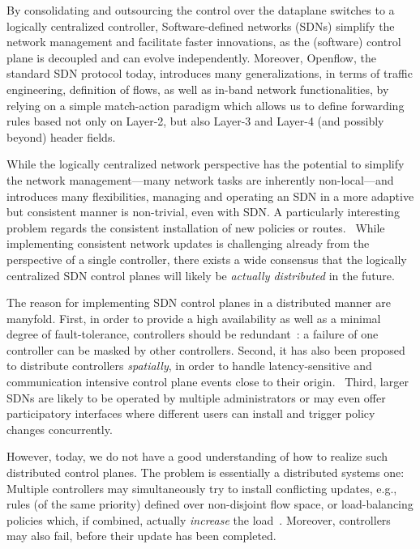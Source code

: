 \documentclass[conference]{sigcomm-alternate}
\begin{document}
By consolidating and outsourcing the control over the dataplane switches to a logically
centralized controller,
Software-defined networks (SDNs) simplify the network management and facilitate faster
innovations, as the (software) control plane is decoupled and can evolve independently.
Moreover, Openflow, the standard SDN protocol today, introduces many generalizations,
in terms of traffic engineering, definition of flows, as well as in-band network functionalities,
by relying on a simple match-action paradigm which allows us to define
forwarding rules based not only on Layer-2, but also Layer-3 and Layer-4 (and possibly beyond)
header fields.

While the logically centralized network perspective has the potential to simplify
the network management---many network tasks are inherently non-local---and introduces
many flexibilities,
managing and operating an SDN in a more adaptive but consistent manner is non-trivial, even with SDN.
A particularly interesting problem regards the consistent installation of new policies
or routes.~\cite{network-update,roger-hotnets,correct} While implementing consistent network updates
is challenging already from the perspective of a single controller, there exists a wide consensus
that the logically centralized SDN control planes will likely be \emph{actually distributed} in the future.

The reason for implementing SDN control planes in a distributed manner are manyfold.
First, in order to provide a high availability as well as a minimal degree of
fault-tolerance, controllers should be redundant~\cite{onix,stn,onos}: a failure
of one controller can be masked by other controllers. Second, it has also been proposed
to distribute controllers \emph{spatially}, in order to handle latency-sensitive and
communication intensive control plane events close to their origin.~\cite{devoflow,kandoo,jukka,disco}
Third, larger SDNs are likely to be operated by multiple administrators or may even offer
participatory interfaces where different users can install and trigger policy changes
concurrently.~\cite{participatory,stn}

However, today, we do not have a good understanding of how to realize
such distributed control planes. The problem is essentially a distributed
systems one: Multiple controllers may simultaneously try to
install conflicting updates, e.g., rules (of the same priority) defined over non-disjoint
flow space, or load-balancing policies which, if combined, actually \emph{increase} the load~\cite{log-cent}. 
Moreover, controllers may also fail,
before their update has been completed. 
\end{document}
